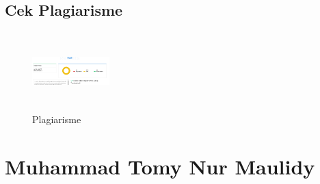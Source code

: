 \begin{enumerate}
\subsection{Cek Plagiarisme}
\begin{figure}[!htbp]
\centering
\includegraphics[width=3cm,height=3cm]{figures/oni/plagiat.PNG}
\caption{Plagiarisme}
\label{plagiarisme}\end{figure}
\end{enumerate}

\section{Muhammad Tomy Nur Maulidy}

